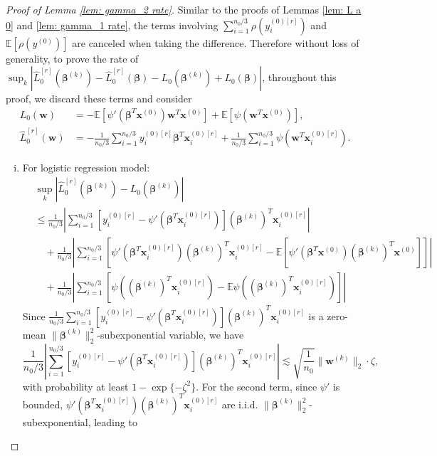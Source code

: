 \documentclass[12pt]{article}
\newcommand{\te}{\mathbb{E}}
\newcommand{\twonorm}[1]{\|#1\|_{2}}
\newcommand{\norma}[1]{\left|#1\right|}
\newcommand{\norm}[1]{|#1|}
\newcommand{\bbeta}{\bm{\beta}}
\newcommand{\bbetak}[1]{\bm{\beta}^{(#1)}}
\newcommand{\bx}{\bm{x}}
\newcommand{\bxk}[1]{\bm{x}^{(#1)}}
\newcommand{\bw}{\bm{w}}
\newcommand{\bwk}[1]{\bm{w}^{(#1)}}
\newcommand{\<}{\langle}
\renewcommand{\>}{\rangle}
\begin{document}
\begin{proof}[Proof of Lemma \ref{lem: gamma_2 rate}]
	Similar to the proofs of Lemmas \ref{lem: L a 0} and \ref{lem: gamma_1 rate}, the terms involving $\sum_{i=1}^{n_0/3}\rho(y_i^{(0)[r]})$ and $\te[\rho(y^{(0)})]$ are canceled when taking the difference. Therefore without loss of generality, to prove the rate of $\sup_{k}\norm{\hat{L}_0^{[r]}(\bbeta^{(k)})-\hat{L}_0^{[r]}(\bbeta)-L_0(\bbetak{k})+L_0(\bbeta)}$, throughout this proof, we discard these terms and consider
	\begin{align}
		L_0(\bw) &= -\te[\psi'(\bbeta^T\bxk{0})\bw^T\bxk{0}] + \te[\psi(\bw^T\bxk{0})], \\
		\hat{L}_0^{[r]}(\bw) &= -\frac{1}{n_0/3}\sum_{i=1}^{n_0/3}y_i^{(0)[r]}\bbeta^T\bx_i^{(0)[r]} + \frac{1}{n_0/3}\sum_{i=1}^{n_0/3}\psi(\bw^T\bx^{(0)[r]}_i).
	\end{align}
	\begin{enumerate}[(i)]
		\item For logistic regression model:
		\begin{align}
			&\sup_k\norma{\hat{L}_0^{[r]}(\bbetak{k}) - L_0(\bbetak{k})} \\
			&\leq \frac{1}{n_0/3}\norma{\sum_{i=1}^{n_0/3} [y_i^{(0)[r]} - \psi'(\bbeta^T\bx_i^{(0)[r]})](\bbetak{k})^T\bx_i^{(0)[r]}} \\
			&\quad + \frac{1}{n_0/3}\norma{\sum_{i=1}^{n_0/3}\left[\psi'(\bbeta^T\bx_i^{(0)[r]})(\bbetak{k})^T\bx_i^{(0)[r]} - \te[\psi'(\bbeta^T\bxk{0})(\bbetak{k})^T\bxk{0}]\right]} \\
			&\quad + \frac{1}{n_0/3}\norma{\sum_{i=1}^{n_0/3} \left[\psi((\bbetak{k})^T\bx_i^{(0)[r]}) - \te\psi((\bbetak{k})^T\bx_i^{(0)[r]}) \right]}
		\end{align}
		Since $\frac{1}{n_0/3}\sum_{i=1}^{n_0/3} [y_i^{(0)[r]} - \psi'(\bbeta^T\bx_i^{(0)[r]})](\bbetak{k})^T\bx_i^{(0)[r]}$ is a zero-mean $\twonorm{\bbetak{k}}^2$-subexponential variable, we have
		\begin{equation}\label{eq: prop 1 term 1}
			\frac{1}{n_0/3}\norma{\sum_{i=1}^{n_0/3} [y_i^{(0)[r]} - \psi'(\bbeta^T\bx_i^{(0)[r]})](\bbetak{k})^T\bx_i^{(0)[r]}} \lesssim \sqrt{\frac{1}{n_0}}\twonorm{\bwk{k}}\cdot \zeta,
		\end{equation}
		with probability at least $1-\exp\{-\zeta^2\}$.
		For the second term, since $\psi'$ is bounded, $\psi'(\bbeta^T\bx_i^{(0)[r]})(\bbetak{k})^T\bx_i^{(0)[r]}$ are i.i.d. $\twonorm{\bbetak{k}}^2$-subexponential, leading to
		\begin{equation}\label{eq: prop 1 term 2}

\end{equation}
\end{enumerate}
\end{proof}
\end{document}
